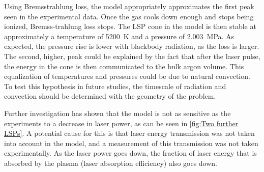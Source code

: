         Using Bremsstrahlung loss, the model appropriately approximates the first peak seen in the experimental data. Once the gas cools down enough and stops being ionized, Bremss-trahlung loss stops. The LSP cone in the model is then stable at approximately a temperature of \qty{5200}{K} and a pressure of \qty{2.003}{MPa}. As expected, the pressure rise is lower with blackbody radiation, as the loss is larger. The second, higher, peak could be explained by the fact that after the laser pulse, the energy in the cone is then communicated to the bulk argon volume. This equalization of temperatures and pressures could be due to natural convection. To test this hypothesis in future studies, the timescale of radiation and convection should be determined with the geometry of the problem.

        Further investigation has shown that the model is not as sensitive as the experiments to a decrease in laser power, as can be seen in \autoref{fig:Two further LSPs}. A potential cause for this is that laser energy transmission was not taken into account in the model, and a measurement of this transmission was not taken experimentally. As the laser power goes down, the fraction of laser energy that is absorbed by the plasma (laser absorption efficiency) also goes down.

